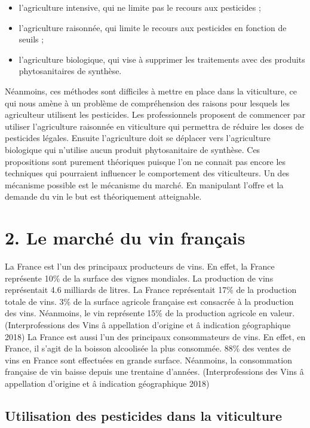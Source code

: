 \documentclass[11pt,]{article}
\providecommand{\tightlist}{%
  \setlength{\itemsep}{0pt}\setlength{\parskip}{0pt}}
\begin{document}
\begin{itemize}
\tightlist
\item
  l'agriculture intensive, qui ne limite pas le recours aux pesticides ;
\item
  l'agriculture raisonnée, qui limite le recours aux pesticides en
  fonction de seuils ;
\item
  l'agriculture biologique, qui vise à supprimer les traitements avec
  des produits phytosanitaires de synthèse.
\end{itemize}

Néanmoins, ces méthodes sont difficiles à mettre en place dans la
viticulture, ce qui nous amène à un problème de compréhension des
raisons pour lesquels les agriculteur utilisent les pesticides. Les
professionnels proposent de commencer par utiliser l'agriculture
raisonnée en viticulture qui permettra de réduire les doses de
pesticides légales. Ensuite l'agriculture doit se déplacer vers
l'agriculture biologique qui n'utilise aucun produit phytosanitaire de
synthèse. Ces propositions sont purement théoriques puisque l'on ne
connait pas encore les techniques qui pourraient influencer le
comportement des viticulteurs. Un des mécanisme possible est le
mécanisme du marché. En manipulant l'offre et la demande du vin le but
est théoriquement atteignable.

\hypertarget{le-marche-du-vin-francais}{%
\section{2. Le marché du vin français}\label{le-marche-du-vin-francais}}

La France est l'un des principaux producteurs de vins. En effet, la
France représente 10\% de la surface des vignes mondiales. La production
de vins représentait 4.6 milliards de litres. La France représentait
17\% de la production totale de vins. 3\% de la surface agricole
française est consacrée à la production des vins. Néanmoins, le vin
représente 15\% de la production agricole en valeur. (Interprofessions
des Vins â appellation d'origine et â indication géographique 2018) La
France est aussi l'un des principaux consommateurs de vins. En effet, en
France, il s'agit de la boisson alcoolisée la plus consommée. 88\% des
ventes de vins en France sont effectuées en grande surface. Néanmoins,
la consommation française de vin baisse depuis une trentaine d'années.
(Interprofessions des Vins â appellation d'origine et â indication
géographique 2018)

\hypertarget{utilisation-des-pesticides-dans-la-viticulture}{%
\subsection{Utilisation des pesticides dans la
viticulture}\label{utilisation-des-pesticides-dans-la-viticulture}}
\end{document}
